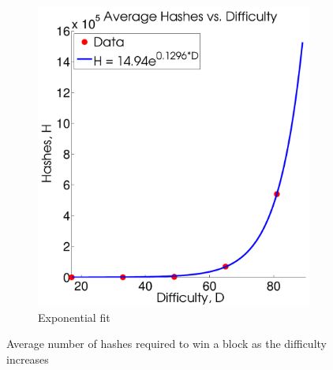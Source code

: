 \documentclass[pdftex,11pt]{article}
\begin{document}
\begin{figure}[H]
\begin{subfigure}[H]{0.4\textwidth}
		\includegraphics[width=\textwidth]{figures/Exp.pdf}
		\caption{Exponential fit}
	\end{subfigure}
	\caption{Average number of hashes required to win a block as the difficulty increases}
	\label{fig:hash}
\end{figure}
\end{document}
